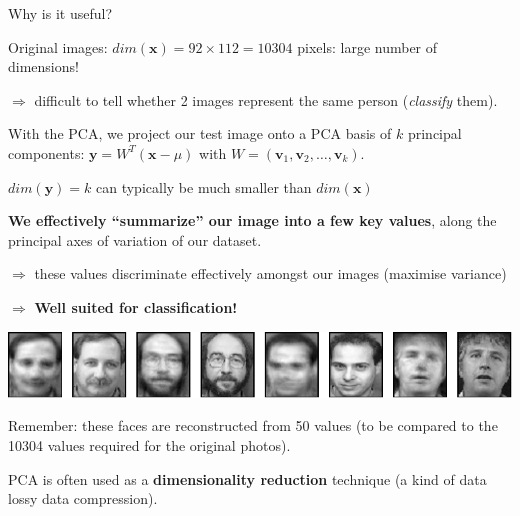 \documentclass[compress]{beamer}
\begin{document}

\begin{frame}{Why is it useful?}


    Original images: $dim(\mathbf{x}) = 92 \times 112 = 10304$ pixels: large number of dimensions!

    $\Rightarrow$ difficult to tell whether 2 images represent the same person
    (\ie \emph{classify} them).

    \pause

    With the PCA, we project our test image onto a PCA basis of $k$ principal
    components: $\mathbf{y} = W^{T} (\mathbf{x} - \mu)$ with $W = (\mathbf{v}_{1}, \mathbf{v}_{2}, \ldots, \mathbf{v}_{k})$.


    $dim(\mathbf{y}) = k$ can typically be much smaller than $dim(\mathbf{x})$

    \pause

    \textbf{We effectively ``summarize'' our image into a few key values}, along
    the principal axes of variation of our dataset.

    $\Rightarrow$ these values discriminate effectively amongst our images
    (maximise variance)
    
    $\Rightarrow$ \textbf{Well suited for classification!}

\end{frame}


\begin{frame}{}
    \begin{center}
        \includegraphics[width=\linewidth]{reconstruction-50-eigenfaces-top-row}

        \vspace{2em}
        Remember: these faces are reconstructed from 50 values (to be compared
        to the 10304 values required for the original photos).

        \vspace{2em}

        \pause

        PCA is often used as a \textbf{dimensionality reduction} technique (\ie a
        kind of data lossy data compression).

    \end{center}
\end{frame}
\end{document}
